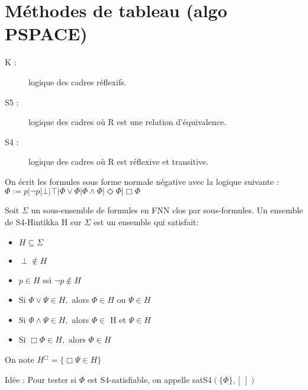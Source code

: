 \documentclass[10pt,a4paper]{article}
\begin{document}
\section{Méthodes de tableau (algo PSPACE)}
\begin{description}
 \item[K  :] logique des cadres réflexifs.
 \item[S5 :] logique des cadres où R est une relation d'équivalence.
 \item[S4 :] logique des cadres où R est réflexive et transitive.
\end{description}

On écrit les formules sous forme normale négative avec la logique suivante :\\
 $ \Phi := p  |  \lnot p  |  \bot  |  \top  |  \Phi \vee \Phi  |  \Phi \wedge \Phi  |  \Diamond \Phi  |  \Box \Phi $

\begin{definition}
 Soit $\Sigma$ un sous-ensemble de formules en FNN clos par sous-formules. Un ensemble de S4-Hintikka H sur $\Sigma$ est un ensemble qui satisfait:
\begin{itemize}
 \item $H \subseteq \Sigma$
 \item $\perp \not \in H$
 \item $p \in H$ ssi $\lnot p \not \in H$
 \item Si $\Phi\vee\Psi \in H,$ alors $\Phi \in H$ ou $\Psi \in H$
  \item Si $\Phi\wedge\Psi \in H,$ alors $\Phi \in$ H et $\Psi \in H$
  \item Si $\Box \Phi \in H,$ alors $\Phi \in H$
\end{itemize}
On note $H^{\Box} = \{\Box \Psi \in H \}$
\end{definition}


Idée : Pour tester si $\Phi$ est S4-satisfiable, on appelle satS4$(\{\Phi\}, [\,])$
\end{document}
